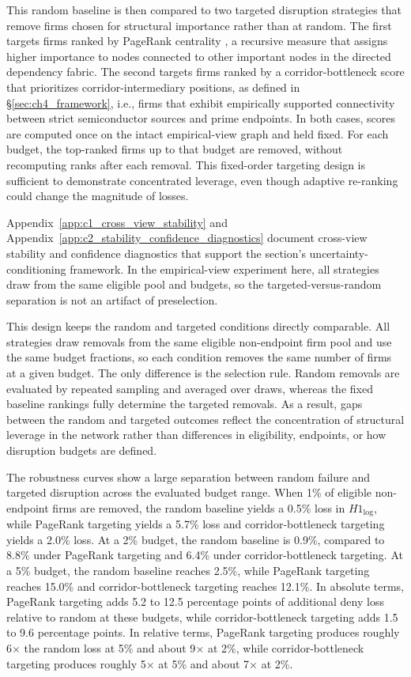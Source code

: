 This random baseline is then compared to two targeted disruption strategies that remove firms chosen for structural importance rather than at random. The first targets firms ranked by PageRank centrality \parencite{Page1999}, a recursive measure that assigns higher importance to nodes connected to other important nodes in the directed dependency fabric. The second targets firms ranked by a corridor-bottleneck score that prioritizes corridor-intermediary positions, as defined in \S\ref{sec:ch4_framework}, i.e., firms that exhibit empirically supported connectivity between strict semiconductor sources and prime endpoints. In both cases, scores are computed once on the intact empirical-view graph and held fixed. For each budget, the top-ranked firms up to that budget are removed, without recomputing ranks after each removal. This fixed-order targeting design is sufficient to demonstrate concentrated leverage, even though adaptive re-ranking could change the magnitude of losses.

Appendix~\ref{app:c1_cross_view_stability} and Appendix~\ref{app:c2_stability_confidence_diagnostics} document cross-view stability and confidence diagnostics that support the section's uncertainty-conditioning framework. In the empirical-view experiment here, all strategies draw from the same eligible pool and budgets, so the targeted-versus-random separation is not an artifact of preselection.

This design keeps the random and targeted conditions directly comparable. All strategies draw removals from the same eligible non-endpoint firm pool and use the same budget fractions, so each condition removes the same number of firms at a given budget. The only difference is the selection rule. Random removals are evaluated by repeated sampling and averaged over draws, whereas the fixed baseline rankings fully determine the targeted removals. As a result, gaps between the random and targeted outcomes reflect the concentration of structural leverage in the network rather than differences in eligibility, endpoints, or how disruption budgets are defined.

The robustness curves show a large separation between random failure and targeted disruption across the evaluated budget range. When 1\% of eligible non-endpoint firms are removed, the random baseline yields a 0.5\% loss in $H1_{\log}$, while PageRank targeting yields a 5.7\% loss and corridor-bottleneck targeting yields a 2.0\% loss. At a 2\% budget, the random baseline is 0.9\%, compared to 8.8\% under PageRank targeting and 6.4\% under corridor-bottleneck targeting. At a 5\% budget, the random baseline reaches 2.5\%, while PageRank targeting reaches 15.0\% and corridor-bottleneck targeting reaches 12.1\%. In absolute terms, PageRank targeting adds 5.2 to 12.5 percentage points of additional deny loss relative to random at these budgets, while corridor-bottleneck targeting adds 1.5 to 9.6 percentage points. In relative terms, PageRank targeting produces roughly 6$\times$ the random loss at 5\% and about 9$\times$ at 2\%, while corridor-bottleneck targeting produces roughly 5$\times$ at 5\% and about 7$\times$ at 2\%.

